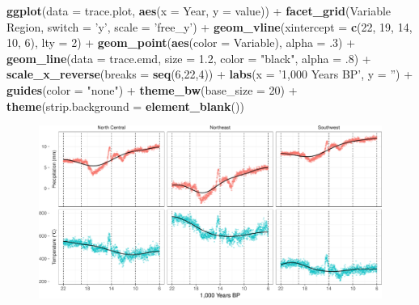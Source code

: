 \documentclass[11pt,]{tufte-handout}
\newenvironment{Shaded}{}{}
\newcommand{\KeywordTok}[1]{\textcolor[rgb]{0.00,0.44,0.13}{\textbf{{#1}}}}
\newcommand{\DataTypeTok}[1]{\textcolor[rgb]{0.56,0.13,0.00}{{#1}}}
\newcommand{\DecValTok}[1]{\textcolor[rgb]{0.25,0.63,0.44}{{#1}}}
\newcommand{\FloatTok}[1]{\textcolor[rgb]{0.25,0.63,0.44}{{#1}}}
\newcommand{\StringTok}[1]{\textcolor[rgb]{0.25,0.44,0.63}{{#1}}}
\newcommand{\NormalTok}[1]{{#1}}
\begin{document}
\begin{Shaded}
\begin{Highlighting}[]
\KeywordTok{ggplot}\NormalTok{(}\DataTypeTok{data =} \NormalTok{trace.plot, }\KeywordTok{aes}\NormalTok{(}\DataTypeTok{x =} \NormalTok{Year, }\DataTypeTok{y =} \NormalTok{value)) +}
\StringTok{  }\KeywordTok{facet_grid}\NormalTok{(Variable ~}\StringTok{ }\NormalTok{Region, }\DataTypeTok{switch =} \StringTok{'y'}\NormalTok{, }\DataTypeTok{scale =} \StringTok{'free_y'}\NormalTok{) +}
\StringTok{  }\KeywordTok{geom_vline}\NormalTok{(}\DataTypeTok{xintercept =} \KeywordTok{c}\NormalTok{(}\DecValTok{22}\NormalTok{, }\DecValTok{19}\NormalTok{, }\DecValTok{14}\NormalTok{, }\DecValTok{10}\NormalTok{, }\DecValTok{6}\NormalTok{), }\DataTypeTok{lty =} \DecValTok{2}\NormalTok{) +}
\StringTok{  }\KeywordTok{geom_point}\NormalTok{(}\KeywordTok{aes}\NormalTok{(}\DataTypeTok{color =} \NormalTok{Variable), }\DataTypeTok{alpha =} \NormalTok{.}\DecValTok{3}\NormalTok{) +}
\StringTok{  }\KeywordTok{geom_line}\NormalTok{(}\DataTypeTok{data =} \NormalTok{trace.emd, }\DataTypeTok{size =} \FloatTok{1.2}\NormalTok{, }\DataTypeTok{color =} \StringTok{"black"}\NormalTok{, }\DataTypeTok{alpha =} \NormalTok{.}\DecValTok{8}\NormalTok{) +}
\StringTok{  }\KeywordTok{scale_x_reverse}\NormalTok{(}\DataTypeTok{breaks =} \KeywordTok{seq}\NormalTok{(}\DecValTok{6}\NormalTok{,}\DecValTok{22}\NormalTok{,}\DecValTok{4}\NormalTok{)) +}
\StringTok{  }\KeywordTok{labs}\NormalTok{(}\DataTypeTok{x =} \StringTok{'1,000 Years BP'}\NormalTok{, }\DataTypeTok{y =} \StringTok{''}\NormalTok{) +}
\StringTok{  }\KeywordTok{guides}\NormalTok{(}\DataTypeTok{color =} \StringTok{"none"}\NormalTok{) +}
\StringTok{  }\KeywordTok{theme_bw}\NormalTok{(}\DataTypeTok{base_size =} \DecValTok{20}\NormalTok{) +}
\StringTok{  }\KeywordTok{theme}\NormalTok{(}\DataTypeTok{strip.background  =} \KeywordTok{element_blank}\NormalTok{())}
\end{Highlighting}
\end{Shaded}

\begin{figure}
\includegraphics{proxymodelcomparison_files/figure-latex/mainplot-1} \end{figure}
\end{document}
